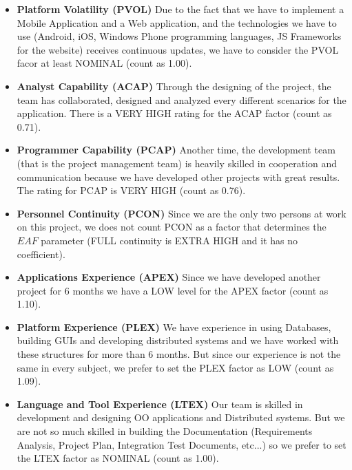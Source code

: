 \documentclass[../../../../projectPlan.tex]{subfiles}
\begin{document}
\begin{itemize}
				\item \textbf{Platform Volatility (PVOL)}
				      Due to the fact that we have to implement a Mobile Application and a Web application, and the technologies we have to use (Android, iOS, Windows Phone programming languages, JS Frameworks for the website) receives continuous updates, we have to consider the PVOL facor at least NOMINAL (count as 1.00).
				
				\item \textbf{Analyst Capability (ACAP)}
				      Through the designing of the project, the team has collaborated, designed and analyzed every different scenarios for the application.
				      There is a VERY HIGH rating for the ACAP factor (count as 0.71).
				
				\item \textbf{Programmer Capability (PCAP)}
				      Another time, the development team (that is the project management team) is heavily skilled in cooperation and communication because we have developed other projects with great results. The rating for PCAP is VERY HIGH (count as 0.76).
				
				\item \textbf{Personnel Continuity (PCON)}
                      Since we are the only two persons at work on this project, we does not count PCON as a factor that determines the \(EAF\) parameter (FULL continuity is EXTRA HIGH and it has no coefficient).
				
				\item \textbf{Applications Experience (APEX)}
                      Since we have developed another project for 6 months we have a LOW level for the APEX factor (count as 1.10).
				
				\item \textbf{Platform Experience (PLEX)}
                      We have experience in using Databases, building GUIs and developing distributed systems and we have worked with these structures for more than 6 months. But since our experience is not the same in every subject, we prefer to set the PLEX factor as LOW (count as 1.09).

				\item \textbf{Language and Tool Experience (LTEX)}
				      Our team is skilled in development and designing OO applications and Distributed systems. But we are not so much skilled in building the Documentation (Requirements Analysis, Project Plan, Integration Test Documents, etc...) so we prefer to set the LTEX factor as NOMINAL (count as 1.00).


\end{itemize}
\end{document}
